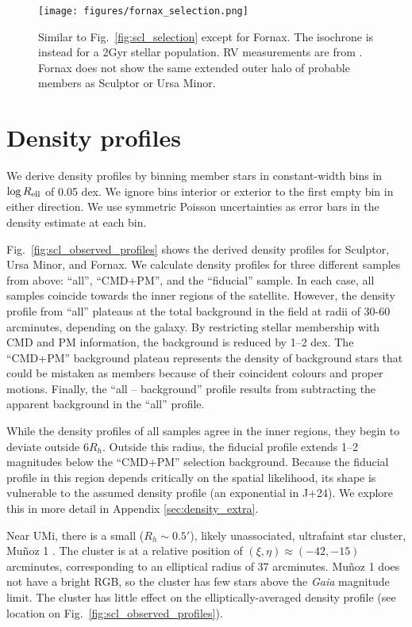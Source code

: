 \begin{figure}
\centering
\texttt{[image: figures/fornax\_selection.png]}
\caption[Fornax sample selection]{Similar to
Fig.~\ref{fig:scl_selection} except for Fornax. The isochrone is instead
for a 2Gyr stellar population. RV measurements are from \citet{WMO2009}.
Fornax does not show the same extended outer halo of probable members as
Sculptor or Ursa Minor.}\label{fig:fornax_selection}
\end{figure}

\section{Density profiles}\label{sec:data_density_profiles}

We derive density profiles by binning member stars in constant-width
bins in \(\log R_{\rm ell}\) of 0.05 dex. We ignore bins interior or
exterior to the first empty bin in either direction. We use symmetric
Poisson uncertainties as error bars in the density estimate at each bin.

Fig.~\ref{fig:scl_observed_profiles} shows the derived density profiles
for Sculptor, Ursa Minor, and Fornax. We calculate density profiles for
three different samples from above: ``all'', ``CMD+PM'', and the
``fiducial'' sample. In each case, all samples coincide towards the
inner regions of the satellite. However, the density profile from
``all'' plateaus at the total background in the field at radii of 30-60
arcminutes, depending on the galaxy. By restricting stellar membership
with CMD and PM information, the background is reduced by 1--2 dex. The
``CMD+PM'' background plateau represents the density of background stars
that could be mistaken as members because of their coincident colours
and proper motions. Finally, the ``all -- background'' profile results
from subtracting the apparent background in the ``all'' profile.

While the density profiles of all samples agree in the inner regions,
they begin to deviate outside \(6R_h\). Outside this radius, the
fiducial profile extends 1--2 magnitudes below the ``CMD+PM'' selection
background. Because the fiducial profile in this region depends
critically on the spatial likelihood, its shape is vulnerable to the
assumed density profile (an exponential in J+24). We explore this in
more detail in Appendix \ref{sec:density_extra}.

Near UMi, there is a small (\(R_h\sim 0.5'\)), likely unassociated,
ultrafaint star cluster, Muñoz 1 \citep{munoz+2012}. The cluster is at a
relative position of \((\xi, \eta) \approx(-42, -15)\) arcminutes,
corresponding to an elliptical radius of 37 arcminutes. Muñoz 1 does not
have a bright RGB, so the cluster has few stars above the \emph{Gaia}
magnitude limit. The cluster has little effect on the
elliptically-averaged density profile (see location on
Fig.~\ref{fig:scl_observed_profiles}).

